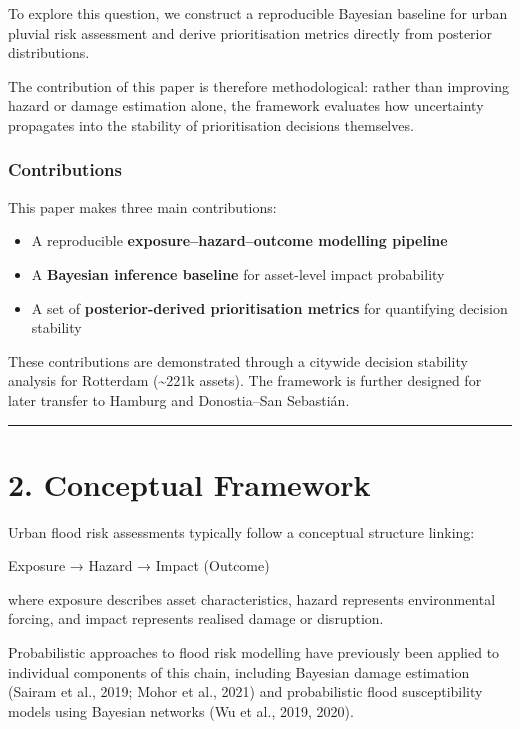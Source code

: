 \documentclass[
]{article}
\providecommand{\tightlist}{%
  \setlength{\itemsep}{0pt}\setlength{\parskip}{0pt}}
\begin{document}
To explore this question, we construct a reproducible Bayesian baseline
for urban pluvial risk assessment and derive prioritisation metrics
directly from posterior distributions.

The contribution of this paper is therefore methodological: rather than
improving hazard or damage estimation alone, the framework evaluates how
uncertainty propagates into the stability of prioritisation decisions
themselves.

\subsubsection{Contributions}\label{contributions}

This paper makes three main contributions:

\begin{itemize}
\tightlist
\item
  A reproducible \textbf{exposure--hazard--outcome modelling pipeline}
\item
  A \textbf{Bayesian inference baseline} for asset-level impact
  probability
\item
  A set of \textbf{posterior-derived prioritisation metrics} for
  quantifying decision stability
\end{itemize}

These contributions are demonstrated through a citywide decision
stability analysis for Rotterdam (\textasciitilde221k assets). The
framework is further designed for later transfer to Hamburg and
Donostia--San Sebastián.

\begin{center}\rule{0.5\linewidth}{0.5pt}\end{center}

\section{2. Conceptual Framework}\label{conceptual-framework}

Urban flood risk assessments typically follow a conceptual structure
linking:

Exposure → Hazard → Impact (Outcome)

where exposure describes asset characteristics, hazard represents
environmental forcing, and impact represents realised damage or
disruption.

Probabilistic approaches to flood risk modelling have previously been
applied to individual components of this chain, including Bayesian
damage estimation (Sairam et al., 2019; Mohor et al., 2021) and
probabilistic flood susceptibility models using Bayesian networks (Wu et
al., 2019, 2020).
\end{document}
